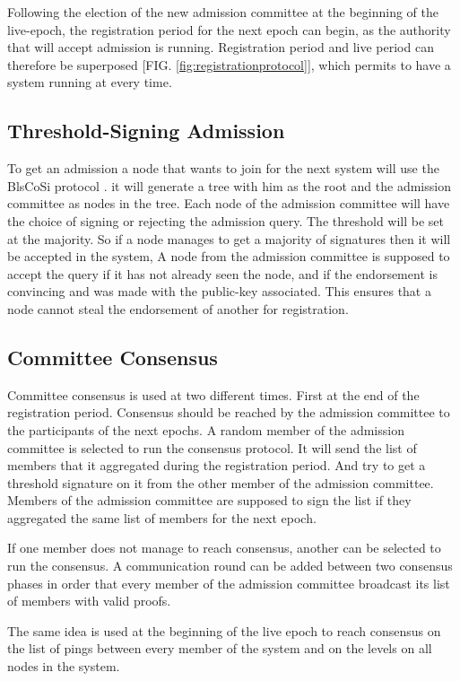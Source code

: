 \documentclass[a4paper,11pt,oneside]{report}
\begin{document}
Following the election of the new admission committee at the beginning of the
live-epoch, the registration period for the next epoch can begin, as the
authority that will accept admission is running. Registration period and live
period can therefore be superposed [FIG. \ref{fig:registrationprotocol}], which
permits to have a system running at every time. 

\subsection{Threshold-Signing Admission}
To get an admission a node that wants to join for the next system will use the
BlsCoSi protocol \cite{BlsCoSi_protocol}. it will generate a tree with him as
the root and the admission committee as nodes in the tree. Each node of the
admission committee will have the choice of signing or rejecting the admission
query. The threshold will be set at the majority. So if a node manages to get a
majority of signatures then it will be accepted in the system, A node from the
admission committee is supposed to accept the query if it has not already seen
the node, and if the endorsement is convincing and was made with the public-key
associated. This ensures that a node cannot steal the endorsement of another
for registration.  

\subsection{Committee Consensus}
Committee consensus is used at two different times. First at the end of the
registration period. Consensus should be reached by the admission committee to
the participants of the next epochs. A random member of the admission committee
is selected to run the consensus protocol. It will send the list of members
that it aggregated during the registration period. And try to get a threshold
signature on it from the other member of the admission committee. Members of
the admission committee are supposed to sign the list if they aggregated the
same list of members for the next epoch.

If one member does not manage to reach consensus, another can be selected to
run the consensus. A communication round can be added between two consensus
phases in order that every member of the admission committee broadcast its list
of members with valid proofs.

The same idea is used at the beginning of the live epoch to reach consensus on
the list of pings between every member of the system and on the levels on all
nodes in the system.
\end{document}

